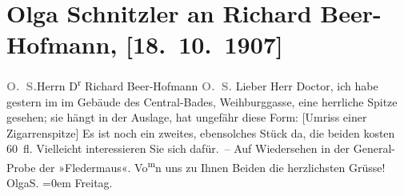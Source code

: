 

         
         \renewcommand{\erwaehntePersonen}{Personen: Richard Beer-Hofmann, Paula Beer-Hofmann, Heinrich Cubasch}
         \renewcommand{\erwaehnteInstitutionen}{Institutionen: Cabaret Fledermaus, Zentralbad}
         \renewcommand{\erwaehnteOrte}{Orte: Weihburggasse, Wien}
         \renewcommand{\erwaehnteWerke}{}
               \section[Olga Schnitzler an Richard Beer-Hofmann, {[}18. 10. 1907{]}]{ Olga Schnitzler an Richard Beer-Hofmann, {[}18. 10. 1907{]}}\nopagebreak{}\rehead{ }\begin{ledgroupsized}[t]{13cm}\normalsize\beginnumbering \toendnotes[C]{\smallbreak\pagebreak[2]} 
\toendnotes[C]{\smallbreak}\pstart{}{\pb}\textcolor{gray}{\textbf{O. S.}}\pend{}{\bigskip}\pstart{}{\pb}Herrn D\textsuperscript{r} Richard
                  Beer-Hofmann \pend{}{\bigskip}\pstart
           \noindent{}{\pb}\textcolor{gray}{\textbf{O. S.}}\pend
           \pstart
           Lieber Herr Doctor, ich habe gestern im \label{K_L01723-1v}\label{K_L01723-1h} im Gebäude des
                  Central-Bades, Weihburggasse, eine herrliche Spitze gesehen; sie hängt in
               der Auslage, hat ungefähr diese Form: {[}Umriss einer
                  Zigarrenspitze{]}\pend
           \pstart
           {\pb}Es ist noch ein zweites, ebensolches Stück da, die
               beiden kosten 60 fl. Vielleicht interessieren Sie sich dafür. – Auf Wiedersehen
                  \label{K_L01723-2v}\label{K_L01723-2h} in der General-Probe der »Fledermaus«.\pend
           \pstart
           Vo\substVorne{}\textsuperscript{m}\substDazwischen{}n\substHinten{} uns zu Ihnen Beiden
               die herzlichsten Grüsse!{\\[\baselineskip]}\spacefill\mbox{OlgaS.}\pend
           \leftskip=0em{}\pstart
           Freitag.\pend
           

\end{ledgroupsized}
